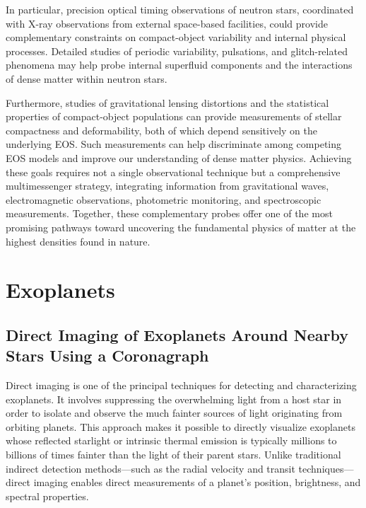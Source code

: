 In particular, precision optical timing observations of neutron stars, coordinated with X-ray observations from external space-based facilities, could provide complementary constraints on compact-object variability and internal physical processes. Detailed studies of periodic variability, pulsations, and glitch-related phenomena may help probe internal superfluid components and the interactions of dense matter within neutron stars.

Furthermore, studies of gravitational lensing distortions and the statistical properties of compact-object populations can provide measurements of stellar compactness and deformability, both of which depend sensitively on the underlying EOS. Such measurements can help discriminate among competing EOS models and improve our understanding of dense matter physics. Achieving these goals requires not a single observational technique but a comprehensive multimessenger strategy, integrating information from gravitational waves, electromagnetic observations, photometric monitoring, and spectroscopic measurements. Together, these complementary probes offer one of the most promising pathways toward uncovering the fundamental physics of matter at the highest densities found in nature.

\section{Exoplanets}\label{exoplanets}

\subsection{Direct Imaging of Exoplanets Around Nearby Stars Using a Coronagraph}\label{direct-imaging-of-exoplanets-around-nearby-stars-using-a-coronagraph}

Direct imaging is one of the principal techniques for detecting and characterizing exoplanets. It involves suppressing the overwhelming light from a host star in order to isolate and observe the much fainter sources of light originating from orbiting planets. This approach makes it possible to directly visualize exoplanets whose reflected starlight or intrinsic thermal emission is typically millions to billions of times fainter than the light of their parent stars. Unlike traditional indirect detection methods---such as the radial velocity and transit techniques---direct imaging enables direct measurements of a planet's position, brightness, and spectral properties.

